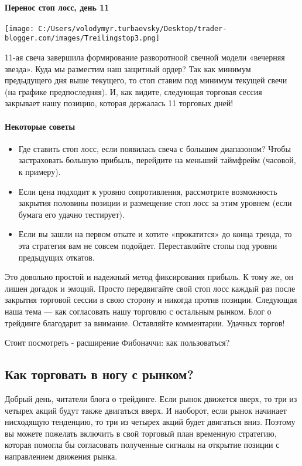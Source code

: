 \documentclass[a5paper]{article}
\begin{document}
\paragraph{Перенос стоп лосс, день 11}

\texttt{[image: C:/Users/volodymyr.turbaevsky/Desktop/trader-blogger.com/images/Treilingstop3.png]}

11-ая свеча завершила формирование разворотноой свечной модели
«вечерняя звезда». Куда мы разместим наш защитный ордер? Так как
минимум предыдущего дня выше текущего, то стоп ставим под минимум
текущей свечи (на графике предпоследняя). И, как видите, следующая
торговая сессия закрывает нашу позицию, которая держалась 11 торговых
дней!

\paragraph{Некоторые советы}
\begin{itemize}
\item     Где ставить стоп лосс, если появилась свеча с большим диапазоном? Чтобы застраховать большую прибыль, перейдите на меньший таймфрейм (часовой, к примеру).
\item     Если цена подходит к уровню сопротивления, рассмотрите возможность закрытия половины позиции и размещение стоп лосс за этим уровнем (если бумага его удачно тестирует).
\item     Если вы зашли на первом откате и хотите «прокатится» до конца тренда, то эта стратегия вам не совсем подойдет. Переставляйте стопы под уровни предыдущих откатов.
\end{itemize}

Это довольно простой и надежный метод фиксирования прибыль. К тому же, он лишен догадок и эмоций. Просто передвигайте свой стоп лосс каждый раз после закрытия торговой сессии в свою сторону и никогда против позиции. Следующая наша тема — как согласовать нашу торговлю с остальным рынком. Блог о трейдинге благодарит за внимание. Оставляйте комментарии. Удачных торгов!


Стоит посмотреть - расширение Фибоначчи: как пользоваться?

\subsection{Как торговать в ногу с рынком?}

Добрый день, читатели блога о трейдинге. Если рынок движется вверх, то
три из четырех акций будут также двигаться вверх. И наоборот, если
рынок начинает нисходящую тенденцию, то три из четырех акций будет
двигаться вниз. Поэтому вы можете пожелать включить в свой торговый
план временную стратегию, которая помогла бы согласовать полученные
сигналы на открытие позиции с направлением движения рынка.
\end{document}
